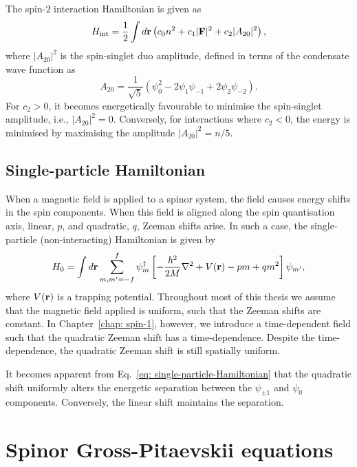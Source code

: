 The spin-2 interaction Hamiltonian is given as
\begin{equation}\label{eq: spin-2-interacting-Hamiltonian}
    H_\mathrm{int} = \frac{1}{2}\int d\vb{r}\left(c_0n^2+c_1|\vb{F}|^2
    +c_2|A_{20}|^2\right),
\end{equation}
where \(|A_{20}|^2\) is the spin-singlet duo amplitude, defined in terms of
the condensate wave function as
\begin{equation}
    A_{20} = \frac{1}{\sqrt{5}}\left(\psi_0^2-2\psi_1\psi_{-1}
    +2\psi_2\psi_{-2}\right).
\end{equation}
For \(c_2 > 0\), it becomes energetically favourable to minimise the
spin-singlet amplitude, i.e., \(|A_{20}|^2 = 0\).
Conversely, for interactions where \(c_2 < 0\), the energy is minimised by
maximising the amplitude \(|A_{20}|^2=n/5\).

\subsection{Single-particle Hamiltonian}
When a magnetic field is applied to a spinor system, the field causes energy
shifts in the spin components.
When this field is aligned along the spin quantisation axis, linear, \(p\), and
quadratic, \(q\), Zeeman shifts arise.
In such a case, the single-particle (non-interacting) Hamiltonian is given
by~\cite{Kawaguchi2012}
\begin{equation}\label{eq: single-particle-Hamiltonian}
    H_0 = \int d\vb{r}\sum_{m,m'=-f}^{f} \psi_m^\dagger \left[
        -\frac{\hbar^2}{2M}\nabla^2 + V(\vb{r}) - pm + qm^2\right]\psi_{m'},
\end{equation}
where \(V(\vb{r})\) is a trapping potential.
Throughout most of this thesis we assume that the magnetic field applied is
uniform, such that the Zeeman shifts are constant.
In Chapter~\ref{chap: spin-1}, however, we introduce a time-dependent field
such that the quadratic Zeeman shift has a time-dependence.
Despite the time-dependence, the quadratic Zeeman shift is still spatially
uniform.

It becomes apparent from Eq.~\eqref{eq: single-particle-Hamiltonian} that the
quadratic shift uniformly alters the energetic separation between the
\(\psi_{\pm 1}\) and \(\psi_0\) components.
Conversely, the linear shift maintains the separation.

\section{Spinor Gross-Pitaevskii equations}
